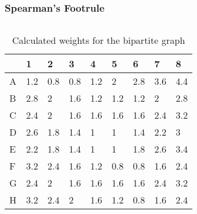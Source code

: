 \begin{frame}[t]
\frametitle{Spearman's Footrule}
\begin{columns}
\begin{column}{0.5\textwidth}
\begin{table}[h]
\footnotesize
\begin{tabular}{|l|llllllll|}\hline
  & 1   & 2   & 3   & 4   & 5   & 6   & 7   & 8   \\\hline
A & 1.2 & 0.8 & 0.8 & 1.2 & 2   & 2.8 & 3.6 & 4.4 \\
B & 2.8 & 2   & 1.6 & 1.2 & 1.2 & 1.2 & 2   & 2.8 \\
C & 2.4 & 2   & 1.6 & 1.6 & 1.6 & 1.6 & 2.4 & 3.2 \\
D & 2.6 & 1.8 & 1.4 & 1   & 1   & 1.4 & 2.2 & 3   \\
E & 2.2 & 1.8 & 1.4 & 1   & 1   & 1.8 & 2.6 & 3.4 \\
F & 3.2 & 2.4 & 1.6 & 1.2 & 0.8 & 0.8 & 1.6 & 2.4 \\
G & 2.4 & 2   & 1.6 & 1.6 & 1.6 & 1.6 & 2.4 & 3.2 \\
H & 3.2 & 2.4 & 2   & 1.6 & 1.2 & 0.8 & 1.6 & 2.4 \\\hline
\end{tabular}
\caption{Calculated weights for the bipartite graph}
\end{table}
\normalsize
\end{column}
\begin{column}{0.5\textwidth}

\end{column}
\end{columns}
\end{frame}
